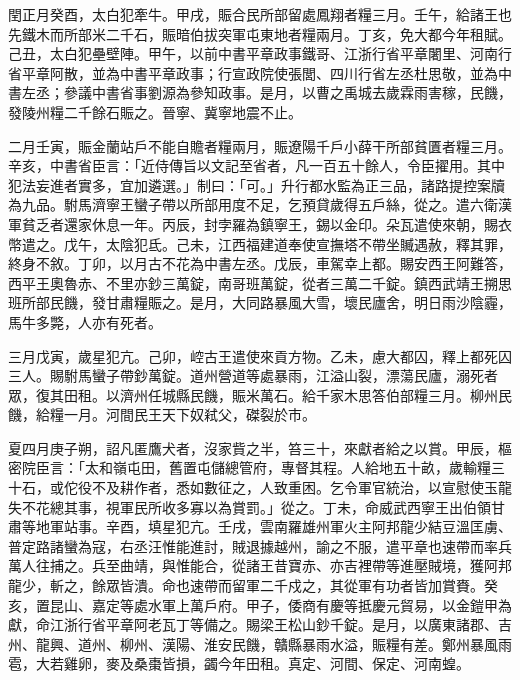 \begin{pinyinscope}
 閏正月癸酉，太白犯牽牛。甲戌，賑合民所部留處鳳翔者糧三月。壬午，給諸王也先鐵木而所部米二千石，賑暗伯拔突軍屯東地者糧兩月。丁亥，免大都今年租賦。己丑，太白犯壘壁陣。甲午，以前中書平章政事鐵哥、江浙行省平章闍里、河南行省平章阿散，並為中書平章政事；行宣政院使張閭、四川行省左丞杜思敬，並為中書左丞；參議中書省事劉源為參知政事。是月，以曹之禹城去歲霖雨害稼，民饑，發陵州糧二千餘石賑之。晉寧、冀寧地震不止。



 二月壬寅，賑金蘭站戶不能自贍者糧兩月，賑遼陽千戶小薛干所部貧匱者糧三月。辛亥，中書省臣言：「近侍傳旨以文記至省者，凡一百五十餘人，令臣擢用。其中犯法妄進者實多，宜加遴選。」制曰：「可。」升行都水監為正三品，諸路提控案牘為九品。駙馬濟寧王蠻子帶以所部用度不足，乞預貸歲得五戶絲，從之。遣六衛漢軍貧乏者還家休息一年。丙辰，封孛羅為鎮寧王，錫以金印。朵瓦遣使來朝，賜衣幣遣之。戊午，太陰犯氐。己未，江西福建道奉使宣撫塔不帶坐贓遇赦，釋其罪，終身不敘。丁卯，以月古不花為中書左丞。戊辰，車駕幸上都。賜安西王阿難答，西平王奧魯赤、不里亦鈔三萬錠，南哥班萬錠，從者三萬二千錠。鎮西武靖王搠思班所部民饑，發甘肅糧賑之。是月，大同路暴風大雪，壞民廬舍，明日雨沙陰霾，馬牛多斃，人亦有死者。



 三月戊寅，歲星犯亢。己卯，崆古王遣使來貢方物。乙未，慮大都囚，釋上都死囚三人。賜駙馬蠻子帶鈔萬錠。道州營道等處暴雨，江溢山裂，漂蕩民廬，溺死者眾，復其田租。以濟州任城縣民饑，賑米萬石。給千家木思答伯部糧三月。柳州民饑，給糧一月。河間民王天下奴弒父，磔裂於市。



 夏四月庚子朔，詔凡匿鷹犬者，沒家貲之半，笞三十，來獻者給之以賞。甲辰，樞密院臣言：「太和嶺屯田，舊置屯儲總管府，專督其程。人給地五十畝，歲輸糧三十石，或佗役不及耕作者，悉如數征之，人致重困。乞令軍官統治，以宣慰使玉龍失不花總其事，視軍民所收多寡以為賞罰。」從之。丁未，命威武西寧王出伯領甘肅等地軍站事。辛酉，填星犯亢。壬戌，雲南羅雄州軍火主阿邦龍少結豆溫匡虜、普定路諸蠻為寇，右丞汪惟能進討，賊退據越州，諭之不服，遣平章也速帶而率兵萬人往捕之。兵至曲靖，與惟能合，從諸王昔寶赤、亦吉裡帶等進壓賊境，獲阿邦龍少，斬之，餘眾皆潰。命也速帶而留軍二千戍之，其從軍有功者皆加賞賚。癸亥，置昆山、嘉定等處水軍上萬戶府。甲子，倭商有慶等抵慶元貿易，以金鎧甲為獻，命江浙行省平章阿老瓦丁等備之。賜梁王松山鈔千錠。是月，以廣東諸郡、吉州、龍興、道州、柳州、漢陽、淮安民饑，贛縣暴雨水溢，賑糧有差。鄭州暴風雨雹，大若雞卵，麥及桑棗皆損，蠲今年田租。真定、河間、保定、河南蝗。




\end{pinyinscope}
